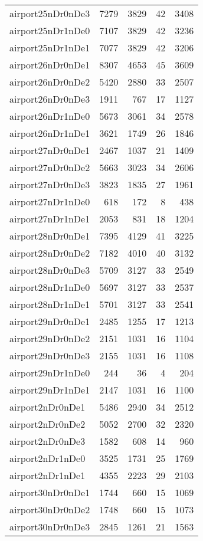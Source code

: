 \documentclass[../../../thesis.tex]{subfiles}
\begin{document}
\begin{longtable}{lrrrr}
airport25nDr0nDe3 & 7279 & 3829 & 42 & 3408 \\
airport25nDr1nDe0 & 7107 & 3829 & 42 & 3236 \\
airport25nDr1nDe1 & 7077 & 3829 & 42 & 3206 \\
airport26nDr0nDe1 & 8307 & 4653 & 45 & 3609 \\
airport26nDr0nDe2 & 5420 & 2880 & 33 & 2507 \\
airport26nDr0nDe3 & 1911 & 767 & 17 & 1127 \\
airport26nDr1nDe0 & 5673 & 3061 & 34 & 2578 \\
airport26nDr1nDe1 & 3621 & 1749 & 26 & 1846 \\
airport27nDr0nDe1 & 2467 & 1037 & 21 & 1409 \\
airport27nDr0nDe2 & 5663 & 3023 & 34 & 2606 \\
airport27nDr0nDe3 & 3823 & 1835 & 27 & 1961 \\
airport27nDr1nDe0 & 618 & 172 & 8 & 438 \\
airport27nDr1nDe1 & 2053 & 831 & 18 & 1204 \\
airport28nDr0nDe1 & 7395 & 4129 & 41 & 3225 \\
airport28nDr0nDe2 & 7182 & 4010 & 40 & 3132 \\
airport28nDr0nDe3 & 5709 & 3127 & 33 & 2549 \\
airport28nDr1nDe0 & 5697 & 3127 & 33 & 2537 \\
airport28nDr1nDe1 & 5701 & 3127 & 33 & 2541 \\
airport29nDr0nDe1 & 2485 & 1255 & 17 & 1213 \\
airport29nDr0nDe2 & 2151 & 1031 & 16 & 1104 \\
airport29nDr0nDe3 & 2155 & 1031 & 16 & 1108 \\
airport29nDr1nDe0 & 244 & 36 & 4 & 204 \\
airport29nDr1nDe1 & 2147 & 1031 & 16 & 1100 \\
airport2nDr0nDe1 & 5486 & 2940 & 34 & 2512 \\
airport2nDr0nDe2 & 5052 & 2700 & 32 & 2320 \\
airport2nDr0nDe3 & 1582 & 608 & 14 & 960 \\
airport2nDr1nDe0 & 3525 & 1731 & 25 & 1769 \\
airport2nDr1nDe1 & 4355 & 2223 & 29 & 2103 \\
airport30nDr0nDe1 & 1744 & 660 & 15 & 1069 \\
airport30nDr0nDe2 & 1748 & 660 & 15 & 1073 \\
airport30nDr0nDe3 & 2845 & 1261 & 21 & 1563 \\

\end{longtable}
\end{document}
